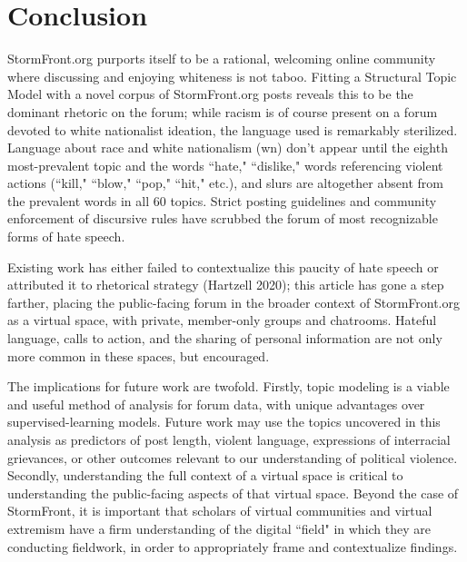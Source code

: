 \documentclass[12pt]{paper}
\begin{document}
\section{Conclusion}
StormFront.org purports itself to be a rational, welcoming online community where discussing and enjoying whiteness is not taboo. Fitting a Structural Topic Model with a novel corpus of StormFront.org posts reveals this to be the dominant rhetoric on the forum; while racism is of course present on a forum devoted to white nationalist ideation, the language used is remarkably sterilized. Language about race and white nationalism (wn) don't appear until the eighth most-prevalent topic and the words ``hate," ``dislike," words referencing violent actions (``kill," ``blow," ``pop," ``hit," etc.), and slurs are altogether absent from the prevalent words in all 60 topics. Strict posting guidelines and community enforcement of discursive rules have scrubbed the forum of most recognizable forms of hate speech.

Existing work has either failed to contextualize this paucity of hate speech or attributed it to rhetorical strategy (Hartzell 2020); this article has gone a step farther, placing the public-facing forum in the broader context of StormFront.org as a virtual space, with private, member-only groups and chatrooms. Hateful language, calls to action, and the sharing of personal information are not only more common in these spaces, but encouraged.

The implications for future work are twofold. Firstly, topic modeling is a viable and useful method of analysis for forum data, with unique advantages over supervised-learning models. Future work may use the topics uncovered in this analysis as predictors of post length, violent language, expressions of interracial grievances, or other outcomes relevant to our understanding of political violence. Secondly, understanding the full context of a virtual space is critical to understanding the public-facing aspects of that virtual space. Beyond the case of StormFront, it is important that scholars of virtual communities and virtual extremism have a firm understanding of the digital ``field" in which they are conducting fieldwork, in order to appropriately frame and contextualize findings.
\end{document}
